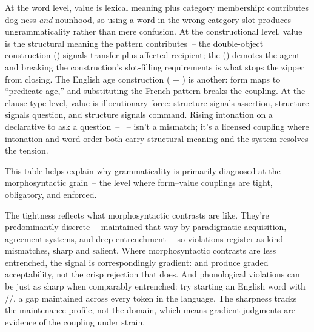 At the word level, value is lexical meaning plus category membership:  contributes dog-ness \emph{and} nounhood, so using a word in the wrong category slot produces ungrammaticality rather than mere confusion. At the constructional level, value is the structural meaning the pattern contributes~-- the double-object construction () signals transfer plus affected recipient; the  () demotes the agent~-- and breaking the construction's slot-filling requirements is what stops the zipper from closing. The English age construction ( + ) is another: form maps to \enquote{predicate age,} and substituting the French  pattern breaks the coupling. At the clause-type level, value is illocutionary force:  structure signals assertion,  structure signals question, and  structure signals command. Rising intonation on a declarative to ask a question~-- ~-- isn't a mismatch; it's a licensed coupling where intonation and word order both carry structural meaning and the system resolves the tension.

This table helps explain why grammaticality is primarily diagnosed at the morphosyntactic grain~-- the level where form--value couplings are tight, obligatory, and enforced.

The tightness reflects what morphosyntactic contrasts are like. They're predominantly discrete~-- maintained that way by paradigmatic acquisition, agreement systems, and deep entrenchment~-- so violations register as kind-mismatches, sharp and salient. Where morphosyntactic contrasts are less entrenched, the signal is correspondingly gradient:  and  produce graded acceptability, not the crisp rejection that \ungram{} does. And phonological violations can be just as sharp when comparably entrenched: try starting an English word with //, a gap maintained across every token in the language. The sharpness tracks the maintenance profile, not the domain, which means gradient judgments are evidence of the coupling under strain.

